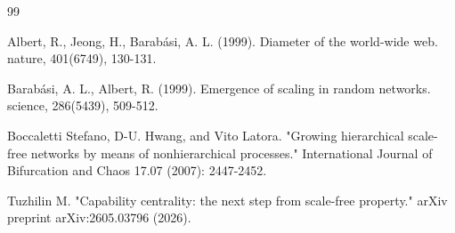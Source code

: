 \documentclass[12pt, a4paper]{extarticle}
\begin{document}
\begin{thebibliography}{99}

Albert, R., Jeong, H., Barabási, A. L. (1999). Diameter of the world-wide web. nature, 401(6749), 130-131.

Barabási, A. L., Albert, R. (1999). Emergence of scaling in random networks. science, 286(5439), 509-512.

Boccaletti Stefano, D-U. Hwang, and Vito Latora. "Growing hierarchical scale-free networks by means of nonhierarchical processes." International Journal of Bifurcation and Chaos 17.07 (2007): 2447-2452.

 Tuzhilin M. "Capability centrality: the next step from scale-free property." arXiv preprint arXiv:2605.03796 (2026).


\end{thebibliography}
\end{document}
